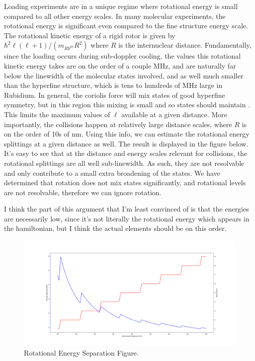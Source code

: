 \documentclass[prl, longbibliography]{revtex4-2}
\begin{document}
Loading experiments are in a unique regime where rotational energy is small compared to all other energy scales. In many molecular experiments, the rotational energy is significant even compared to the fine structure energy scale. The rotational kinetic energy of a rigid rotor is given by $\hbar^2 \ell (\ell+1)/(m_{Rb^{87}}R^2)$ where $R$ is the internuclear distance. Fundamentally, since the loading occurs during sub-doppler cooling, the values this rotational kinetic energy takes are on the order of a couple MHz, and are naturally far below the linewidth of the molecular states involved, and as well much smaller than the hyperfine structure, which is tens to hundreds of MHz large in Rubidium. In general, the coriolis force will mix states of good hyperfine symmetry, but in this region this mixing is small and so states should maintain . This limits the maximum values of $\ell$ available at a given distance. More importantly, the collisions happen at relatively large distance scales, where $R$ is on the order of 10s of nm. Using this info, we can estimate the rotational energy splittings at a given distance as well. The result is displayed in the figure below. It's easy to see that at the distance and energy scales relevant for collisions, the rotational splittings are all well sub-linewidth. As such, they are not resolvable and only contribute to a small extra broadening of the states. We have determined that rotation does not mix states significantly, and rotational levels are not resolvable, therefore we can ignore rotation.\cite{hornkohl_parity_2017}

I think the part of this argument that I'm least convinced of is that the energies are necessarily low, since it's not literally the rotational energy which appears in the hamiltonian, but I think the actual elements should be on this order. 

\begin{figure}
  \includegraphics[width=\linewidth]{Rotational_Energy_Separation.png}
  \caption{Rotational Energy Separation Figure.}
  \label{fig:boat1}
\end{figure}
\end{document}
